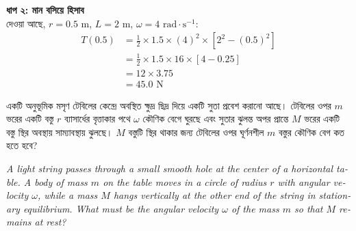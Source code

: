 \documentclass[12pt, a4paper]{article}
\begin{document}
{{\begin{tcolorbox}[solutionbox={সমাধান (Solution)}]
    \vspace{0.5em}
    \noindent\textbf{ধাপ ২: মান বসিয়ে হিসাব} \\
    দেওয়া আছে, $r = 0.5\text{ m}$, $L = 2\text{ m}$, $\omega = 4\text{ rad}\cdot\text{s}^{-1}$:
    \begin{align*}
        T(0.5) &= \frac{1}{2} \times 1.5 \times (4)^2 \times [2^2 - (0.5)^2] \\
               &= \frac{1}{2} \times 1.5 \times 16 \times [4 - 0.25] \\
               &= 12 \times 3.75 \\
               &= \mathbf{45.0}\text{ N}
    \end{align*}
\end{tcolorbox}
\newpage

\begin{tcolorbox}[questionbox={প্রশ্ন (Question) 32}]
    \noindent
    একটি অনুভূমিক মসৃণ টেবিলের কেন্দ্রে অবস্থিত ক্ষুদ্র ছিদ্র দিয়ে একটি সুতা প্রবেশ করানো আছে। টেবিলের ওপর $m$ ভরের একটি বস্তু $r$ ব্যাসার্ধের বৃত্তাকার পথে $\omega$ কৌণিক বেগে ঘুরছে এবং সুতার ঝুলন্ত অপর প্রান্তে $M$ ভরের একটি বস্তু স্থির অবস্থায় সাম্যাবস্থায় ঝুলছে। $M$ বস্তুটি স্থির থাকার জন্য টেবিলের ওপর ঘূর্ণনশীল $m$ বস্তুর কৌণিক বেগ কত হতে হবে?
    
    \vspace{0.8em}
    \begin{english}
    \noindent\textit{\color{darkgray}
    A light string passes through a small smooth hole at the center of a horizontal table. A body of mass $m$ on the table moves in a circle of radius $r$ with angular velocity $\omega$, while a mass $M$ hangs vertically at the other end of the string in stationary equilibrium. What must be the angular velocity $\omega$ of the mass $m$ so that $M$ remains at rest?
    }
    \end{english}
\end{tcolorbox}

\vspace{1em}
\begin{center}
\end{center}}}
\end{document}

